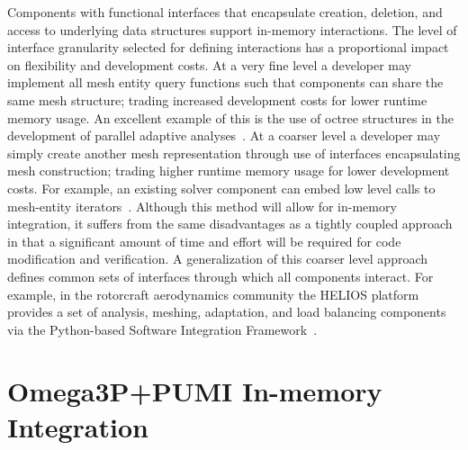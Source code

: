 \documentclass[a4paper]{article}
\begin{document}
Components with functional interfaces that encapsulate creation, deletion, and
access to underlying data structures support in-memory interactions.
The level of interface granularity selected for defining interactions has a
proportional impact on flexibility and development costs.
At a very fine level a developer may implement all mesh entity query functions such
that components can share the same mesh structure; trading increased development
costs for lower runtime memory usage.
An excellent example of this is the use of octree structures in the
development of parallel adaptive analyses~\cite{BursteddeWilcoxGhattas11}.
At a coarser level a developer may simply create another mesh
representation through use of interfaces encapsulating mesh construction;
trading higher runtime memory usage for lower development costs.
For example, an existing solver component can embed low level
calls to mesh-entity iterators~\cite{Ollivier10}.
Although this method will allow for in-memory integration, it suffers from the
same disadvantages as a tightly coupled approach in that a significant amount of
time and effort will be required for code modification and verification.
A generalization of this coarser level approach defines common sets of
interfaces through which all components interact.
For example, in the rotorcraft aerodynamics community the HELIOS platform
provides a set of analysis, meshing, adaptation, and load balancing components
via the Python-based Software Integration Framework~\cite{sankaran2010application}.

\section{Omega3P+PUMI In-memory Integration}\label{sec:omega-pumi}
\end{document}

